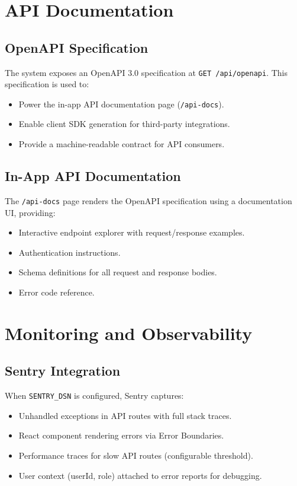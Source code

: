 \documentclass[12pt,a4paper]{report}
\begin{document}
\section{API Documentation}

\subsection{OpenAPI Specification}

The system exposes an OpenAPI 3.0 specification at \texttt{GET /api/openapi}. This specification is used to:
\begin{itemize}[leftmargin=1.5em]
  \item Power the in-app API documentation page (\texttt{/api-docs}).
  \item Enable client SDK generation for third-party integrations.
  \item Provide a machine-readable contract for API consumers.
\end{itemize}

\subsection{In-App API Documentation}

The \texttt{/api-docs} page renders the OpenAPI specification using a documentation UI, providing:
\begin{itemize}[leftmargin=1.5em]
  \item Interactive endpoint explorer with request/response examples.
  \item Authentication instructions.
  \item Schema definitions for all request and response bodies.
  \item Error code reference.
\end{itemize}

\section{Monitoring and Observability}

\subsection{Sentry Integration}

When \texttt{SENTRY\_DSN} is configured, Sentry captures:
\begin{itemize}[leftmargin=1.5em]
  \item Unhandled exceptions in API routes with full stack traces.
  \item React component rendering errors via Error Boundaries.
  \item Performance traces for slow API routes (configurable threshold).
  \item User context (userId, role) attached to error reports for debugging.
\end{itemize}
\end{document}
